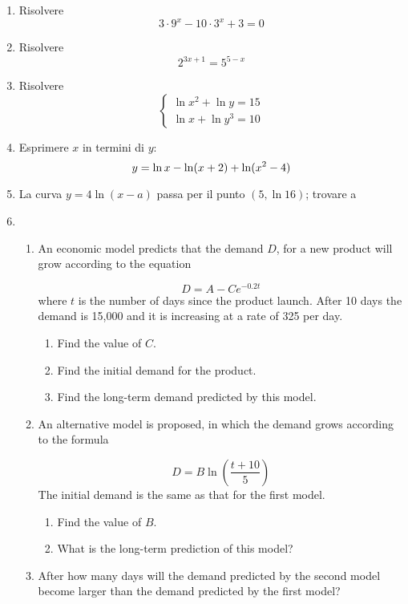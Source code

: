 \begin{enumerate}
\item Risolvere 
\[
3\cdot 9^x -10\cdot 3^x + 3 = 0
\]
\item Risolvere 
\[
2^{3x+1}=5^{5-x}
\]
\item Risolvere 
\[
\left\{
\begin{array}{ll}
\ln x^2 + \ln y =15\\
\ln x + \ln y^3 = 10
\end{array}
\right.
\]
\item Esprimere $x$ in termini di $y$:
\[
y=\ln x-\ln(x+2)+\ln(x^2-4)\\
\]
\item La curva $y=4\ln(x-a)$ passa per il punto $(5, \ln 16)$; trovare a
\item
\begin{enumerate}
\item 
An economic model predicts that the demand $D$, for a new product will grow according to the equation

\[
D = A - Ce^{-0.2t}
\]
where $t$ is the number of days since the product launch.
After 10 days the demand is 15,000 and it is increasing at a rate of 325 per day.

\begin{enumerate}
\item Find the value of $C$.
\item Find the initial demand for the product.
\item Find the long-term demand predicted by this model.
\end{enumerate}
\item  An alternative model is proposed, in which the demand grows according to the formula

\[
D=B\ln\left(
\frac{
t+10
}{
5
}
\right)
\]
The initial demand is the same as that for the first model.

\begin{enumerate}
\item Find the value of $B$.
\item What is the long-term prediction of this model?
\end{enumerate}

\item After how many days will the demand predicted by the second model become larger than the demand predicted by the first model?

\end{enumerate}
\end{enumerate}


